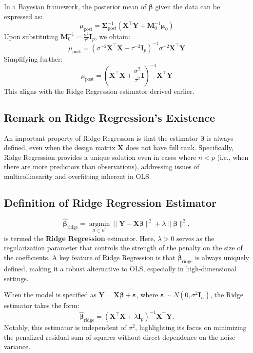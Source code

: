 \documentclass[open=any, 11pt,paper=A4]{scrreprt}
\begin{document}
In a Bayesian framework, the posterior mean of \(\bm{\beta}\) given the data can be expressed as:
\[
\mu_{\text{post}} = \bm{\Sigma}_{\text{post}}^{-1} (\bm{X}^\top \bm{Y} + \bm{M}_0^{-1} \bm{\mu}_0)
\]
Upon substituting \(\bm{M}_0^{-1} = \frac{\sigma^2}{\tau^2} \bm{I}_p\), we obtain:
\[
\mu_{\text{post}} = (\sigma^{-2} \bm{X}^\top \bm{X} + \tau^{-2} \bm{I}_p)^{-1} \sigma^{-2} \bm{X}^\top \bm{Y}
\]
Simplifying further:
\[
\mu_{\text{post}} = (\bm{X}^\top \bm{X} + \frac{\sigma^2}{\tau^2} \bm{I})^{-1} \bm{X}^\top \bm{Y}
\]
This aligns with the Ridge Regression estimator derived earlier.

\subsection*{Remark on Ridge Regression's Existence}

An important property of Ridge Regression is that the estimator \(\bm{\beta}\) is always defined, even when the design matrix \(\bm{X}\) does not have full rank. Specifically, Ridge Regression provides a unique solution even in cases where \(n < p\) (i.e., when there are more predictors than observations), addressing issues of multicollinearity and overfitting inherent in OLS.

\subsection*{Definition of Ridge Regression Estimator}

\[
\hat{\bm{\beta}}_{\text{ridge}} = \operatorname*{argmin}_{\bm{\beta} \in \mathbb{R}^p} \|\bm{Y} - \bm{X} \bm{\beta} \|^2 + \lambda \|\bm{\beta}\|^2,
\]
is termed the \textbf{Ridge Regression} estimator. Here, \(\lambda > 0\) serves as the regularization parameter that controls the strength of the penalty on the size of the coefficients. A key feature of Ridge Regression is that \(\hat{\bm{\beta}}_{\text{ridge}}\) is always uniquely defined, making it a robust alternative to OLS, especially in high-dimensional settings.

When the model is specified as \(\bm{Y} = \bm{X} \bm{\beta} + \bm{\varepsilon}\), where \(\bm{\varepsilon} \sim N(0, \sigma^2 \bm{I}_n)\), the Ridge estimator takes the form:
\[
\hat{\bm{\beta}}_{\text{ridge}} = (\bm{X}^\top \bm{X} + \lambda \bm{I}_p)^{-1} \bm{X}^\top \bm{Y}.
\]
Notably, this estimator is independent of \(\sigma^2\), highlighting its focus on minimizing the penalized residual sum of squares without direct dependence on the noise variance.
\end{document}
